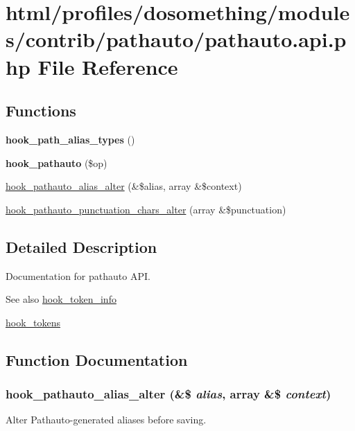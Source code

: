 \hypertarget{pathauto_8api_8php}{
\section{html/profiles/dosomething/modules/contrib/pathauto/pathauto.api.php File Reference}
\label{pathauto_8api_8php}
}
\subsection*{Functions}
\begin{DoxyCompactItemize}
\item 
\hypertarget{pathauto_8api_8php_a16fbd5227b2937cac2ba8c9f396880c9}{
{\bfseries hook\_\-path\_\-alias\_\-types} ()}
\label{pathauto_8api_8php_a16fbd5227b2937cac2ba8c9f396880c9}

\item 
\hypertarget{pathauto_8api_8php_af37425c61491a1d88d9bc3c9d091e054}{
{\bfseries hook\_\-pathauto} (\$op)}
\label{pathauto_8api_8php_af37425c61491a1d88d9bc3c9d091e054}

\item 
\hyperlink{pathauto_8api_8php_a7600070f06299fd7e1f9f33255d5947e}{hook\_\-pathauto\_\-alias\_\-alter} (\&\$alias, array \&\$context)
\item 
\hyperlink{pathauto_8api_8php_a9b3ef2a8def13dc74ca8ecffb2c7193c}{hook\_\-pathauto\_\-punctuation\_\-chars\_\-alter} (array \&\$punctuation)
\end{DoxyCompactItemize}


\subsection{Detailed Description}
Documentation for pathauto API.

\begin{DoxySeeAlso}{See also}
\hyperlink{group__hooks_gab868597197cf36911f95dcd29ae0b954}{hook\_\-token\_\-info} 

\hyperlink{group__hooks_ga3bfd87d9a19b2397b0f970e1cff7ea4f}{hook\_\-tokens} 
\end{DoxySeeAlso}


\subsection{Function Documentation}
\hypertarget{pathauto_8api_8php_a7600070f06299fd7e1f9f33255d5947e}{
\subsubsection[{hook\_\-pathauto\_\-alias\_\-alter}]{\setlength{\rightskip}{0pt plus 5cm}hook\_\-pathauto\_\-alias\_\-alter (\&\$ {\em alias}, \/  array \&\$ {\em context})}}
\label{pathauto_8api_8php_a7600070f06299fd7e1f9f33255d5947e}
Alter Pathauto-\/generated aliases before saving.



